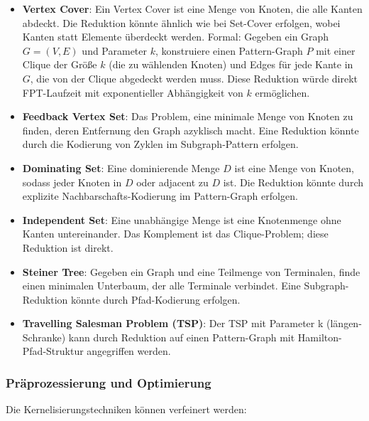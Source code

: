 ﻿\documentclass[a4paper,12pt]{article}
\theoremstyle{definition}
\begin{document}
\begin{itemize}
	\item \textbf{Vertex Cover}: Ein Vertex Cover ist eine Menge von Knoten, die alle Kanten abdeckt. Die Reduktion könnte ähnlich wie bei Set-Cover erfolgen, wobei Kanten statt Elemente überdeckt werden. Formal: Gegeben ein Graph $G = (V,E)$ und Parameter $k$, konstruiere einen Pattern-Graph $P$ mit einer Clique der Größe $k$ (die zu wählenden Knoten) und Edges für jede Kante in $G$, die von der Clique abgedeckt werden muss. Diese Reduktion würde direkt FPT-Laufzeit mit exponentieller Abhängigkeit von $k$ ermöglichen.
	
	\item \textbf{Feedback Vertex Set}: Das Problem, eine minimale Menge von Knoten zu finden, deren Entfernung den Graph azyklisch macht. Eine Reduktion könnte durch die Kodierung von Zyklen im Subgraph-Pattern erfolgen.
	
	\item \textbf{Dominating Set}: Eine dominierende Menge $D$ ist eine Menge von Knoten, sodass jeder Knoten in $D$ oder adjacent zu $D$ ist. Die Reduktion könnte durch explizite Nachbarschafts-Kodierung im Pattern-Graph erfolgen.
	
	\item \textbf{Independent Set}: Eine unabhängige Menge ist eine Knotenmenge ohne Kanten untereinander. Das Komplement ist das Clique-Problem; diese Reduktion ist direkt.
	
	\item \textbf{Steiner Tree}: Gegeben ein Graph und eine Teilmenge von Terminalen, finde einen minimalen Unterbaum, der alle Terminale verbindet. Eine Subgraph-Reduktion könnte durch Pfad-Kodierung erfolgen.
	
	\item \textbf{Travelling Salesman Problem (TSP)}: Der TSP mit Parameter k (längen-Schranke) kann durch Reduktion auf einen Pattern-Graph mit Hamilton-Pfad-Struktur angegriffen werden.
\end{itemize}

\subsubsection{Präprozessierung und Optimierung}

Die Kernelisierungstechniken können verfeinert werden:
\end{document}

